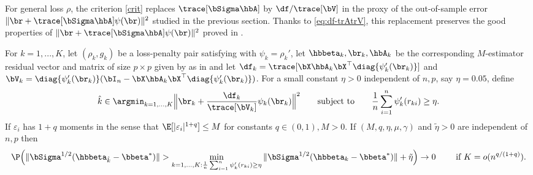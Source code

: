 \documentclass{colt2022} %
\def\eps{\varepsilon}
\numberwithin{equation}{section}
\begin{document}
For general loss $\rho$, the criterion \eqref{crit} replaces $\trace[\bSigma\hbA]$
by $\df/\trace[\bV]$
in the proxy of the out-of-sample error $\|\br + \trace[\bSigma\hbA]\psi(\br)\|^2$
studied in the previous section.
Thanks to \eqref{eq:df-trAtrV}, this replacement preserves
the good properties of $\|\br + \trace[\bSigma\hbA]\psi(\br)\|^2$
proved in .

\begin{theorem}
    \label{thm:selection-crit}
    For $k=1,...,K$,
    let $(\rho_k,g_k)$ be a loss-penalty pair
    satisfying 
    with $\psi_k=\rho_k'$,
    let $\hbbeta_k,\br_k,\hbA_k$ be the corresponding $M$-estimator
    residual vector and matrix of size $p\times p$ given by
     as in 
    and let 
    $\df_k = \trace[\bX\hbA_k \bX^\top\diag\{\psi_k'(\br_k)\}]$
    and 
    $\bV_k =\diag\{\psi_k'(\br_k)\}(\bI_n -  \bX\hbA_k \bX^\top\diag\{\psi_k'(\br_k)\})$.
    For a small constant $\eta>0$ independent of $n,p$, say $\eta=0.05$,
    define
    $$\hat k \in \argmin_{k=1,...,K} 
    \Big\|\br_k + \frac{\df_k}{\trace[\bV_k]}\psi_k(\br_k)\Big\|^2
    \qquad \text{subject to}
    \qquad
    \frac 1 n \sum_{i=1}^n \psi_k'(r_{ki}) \ge \eta.$$
    If $\eps_i$ has $1+q$ moments in the sense
    that $\E[|\eps_i|^{1+q}]\le M$ for constants $q\in (0,1),M>0$.
    If $(M,q,\eta,\mu,\gamma)$ and $\tilde\eta>0$ are independent of $n,p$ then
    \begin{equation*}
    \P\Bigl(
        \|\bSigma^{1/2}(\hbbeta_{\hat k}-\bbeta^*)\|
        >
        \min_{k=1,...,K:
        \frac 1 n \sum_{i=1}^n \psi_k'(r_{ki}) \ge \eta
        }
        \|\bSigma^{1/2}(\hbbeta_k-\bbeta^*)\| 
        + \tilde \eta
    \Bigr)
    \to 0 
    \qquad \text{ if }
    K=o(n^{q/(1+q)}).
    \end{equation*}
\end{theorem}
\end{document}
